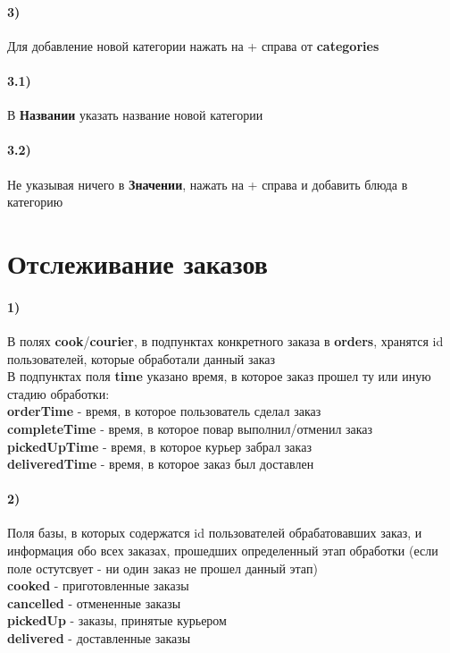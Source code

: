 \documentclass{article}
\begin{document}
   \paragraph{3)}
   {
        Для добавление новой категории нажать на + справа от \textbf{categories}
   }
   \paragraph{3.1)}
   {
        В \textbf{Названии} указать название новой категории
   }
   \paragraph{3.2)}
   {
        Не указывая ничего в \textbf{Значении}, нажать на + справа и добавить блюда в категорию
   }

\section{Отслеживание заказов}
   \paragraph{1)}
   {
        В полях \textbf{cook}/\textbf{courier}, в подпунктах конкретного заказа в \textbf{orders}, хранятся id пользователей, которые обработали данный заказ\\
        В подпунктах поля \textbf{time} указано время, в которое заказ прошел ту или иную стадию обработки:
        \\\quad \textbf{orderTime} - время, в которое пользователь сделал заказ
        \\\quad \textbf{completeTime} - время, в которое повар выполнил/отменил заказ
        \\\quad \textbf{pickedUpTime} - время, в которое курьер забрал заказ
        \\\quad \textbf{deliveredTime} - время, в которое заказ был доставлен
   }
   \paragraph{2)}
   {Поля базы, в которых содержатся id пользователей обрабатовавших заказ, и информация обо всех заказах, прошедших определенный этап обработки (если поле остутсвует - ни один заказ не прошел данный этап)
        \\\quad \textbf{cooked} - приготовленные заказы
        \\\quad \textbf{cancelled} - отмененные заказы
        \\\quad \textbf{pickedUp} - заказы, принятые курьером
        \\\quad \textbf{delivered} - доставленные заказы
   }
\end{document}
